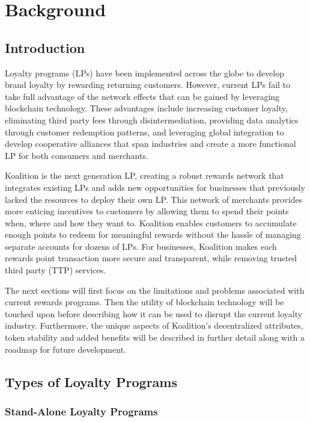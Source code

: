 \section{Background} \label{sec:background}

\subsection{Introduction}
Loyalty programs (LPs) have been implemented across the globe to develop brand loyalty by rewarding returning customers. However, current LPs fail to take full advantage of the network effects that can be gained by leveraging blockchain technology. These advantages include increasing customer loyalty, eliminating third party fees through disintermediation, providing data analytics through customer redemption patterns, and leveraging global integration to develop cooperative alliances that span industries and create a more functional LP for both consumers and merchants. 

Koalition is the next generation LP, creating a robust rewards network that integrates existing LPs and adds new opportunities for businesses that previously lacked the resources to deploy their own LP. This network of merchants provides more enticing incentives to customers by allowing them to spend their points when, where and how they want to.  Koalition enables customers to accumulate enough points to redeem for meaningful rewards without the hassle of managing separate accounts for dozens of LPs. For businesses, Koalition makes each rewards point transaction more secure and transparent, while removing trusted third party (TTP) services.

The next sections will first focus on the limitations and problems associated with current rewards programs. Then the utility of blockchain technology will be touched upon before describing how it can be used to disrupt the current loyalty industry. Furthermore, the unique aspects of Koalition's decentralized attributes, token stability and added benefits will be described in further detail along with a roadmap for future development. 

\subsection{Types of Loyalty Programs}

\subsubsection{Stand-Alone Loyalty Programs}

